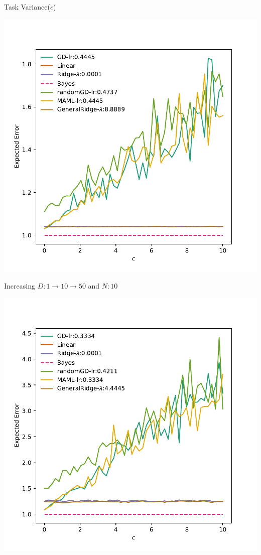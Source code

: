 \documentclass[aspectratio=169]{beamer}
\begin{document}
\begin{frame}{Task Variance($c$)}
{\begin{minipage}{0.33\textwidth}
  \end{minipage}%
  \begin{minipage}{0.33\textwidth}
    \includegraphics[width=\textwidth]{Figures/c-1-50-x-0.pdf}
  \end{minipage}
}
{
\centering
  \color{Pink} Increasing $D:1\to 10 \to 50$ and $N:10$
  \begin{minipage}{0.33\textwidth}
    \includegraphics[width=\textwidth]{Figures/c-1-10-x-0.pdf}

\end{minipage}}
\end{frame}
\end{document}
